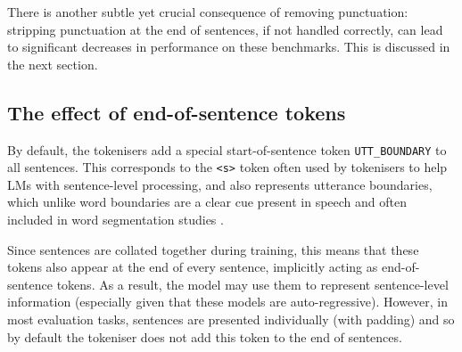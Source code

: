 There is another subtle yet crucial consequence of removing punctuation: stripping punctuation at the end of sentences, if not handled correctly, can lead to significant decreases in performance on these benchmarks. This is discussed in the next section.

\subsection{The effect of end-of-sentence tokens}\label{sec:14-endofsentence}

By default, the tokenisers add a special start-of-sentence token \texttt{UTT\_BOUNDARY} to all sentences. This corresponds to the \texttt{<s>} token often used by tokenisers to help LMs with sentence-level processing, and also represents utterance boundaries, which unlike word boundaries are a clear cue present in speech and often included in word segmentation studies \citep{feliciano-de-faria-2019-utterance-boundaries}. 

Since sentences are collated together during training, this means that these tokens also appear at the end of every sentence, implicitly acting as end-of-sentence tokens. As a result, the model may use them to represent sentence-level information (especially given that these models are auto-regressive). However, in most evaluation tasks, sentences are presented individually (with padding) and so by default the tokeniser does not add this token to the end of sentences. 


